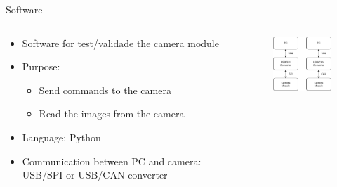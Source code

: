 
\begin{frame}{Software}

    \begin{columns}[t]
        \begin{column}[t]{0.55\textwidth}
            \begin{itemize}
                \item Software for test/validade the camera module
                \item Purpose:
                    \begin{itemize}
                        \item Send commands to the camera
                        \item Read the images from the camera
                    \end{itemize}
                \item Language: Python
                \item Communication between PC and camera: USB/SPI or USB/CAN converter
            \end{itemize}
        \end{column}
        \begin{column}[t]{0.45\textwidth}
            \vspace{0.5cm}
            \begin{figure}[!ht]
                \begin{center}
                    \includegraphics[width=4.5cm]{figures/software-diagram}
                \end{center}
            \end{figure}
        \end{column}
    \end{columns}

\end{frame}
